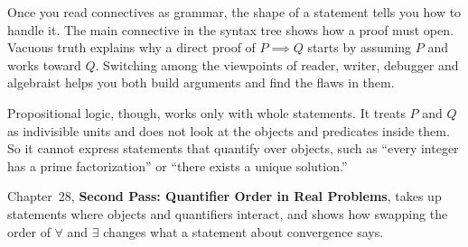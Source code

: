 Once you read connectives as grammar, the shape of a statement tells you how to handle it. The main connective in the syntax tree shows how a proof must open. Vacuous truth explains why a direct proof of $P \implies Q$ starts by assuming $P$ and works toward $Q$. Switching among the viewpoints of reader, writer, debugger and algebraist helps you both build arguments and find the flaws in them.

Propositional logic, though, works only with whole statements. It treats $P$ and $Q$ as indivisible units and does not look at the objects and predicates inside them. So it cannot express statements that quantify over objects, such as ``every integer has a prime factorization'' or ``there exists a unique solution.''

Chapter~28, \textbf{Second Pass: Quantifier Order in Real Problems}, takes up statements where objects and quantifiers interact, and shows how swapping the order of $\forall$ and $\exists$ changes what a statement about convergence says.

\newpage
